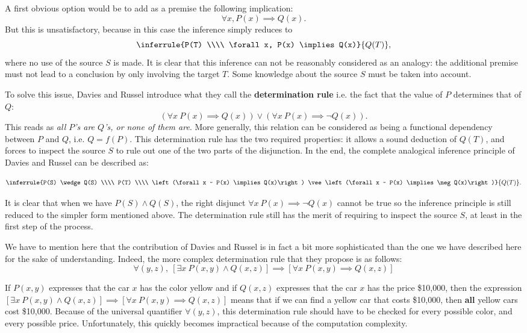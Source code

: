 A first obvious option would be to add as a premise the following implication:
$$\forall x, P(x) \implies Q(x).$$
But this is unsatisfactory, because in this case the inference simply reduces
to
$$\inferrule{P(T) \\\\ \forall x, P(x) \implies Q(x)}{Q(T)},$$ where no use of the
source $S$ is made. It is clear that this inference can not be reasonably
considered as an analogy: the additional premise must not lead to a conclusion
by only involving the target $T$. Some knowledge about the source $S$ must be
taken into account.

To solve this issue, Davies and Russel introduce what they call the
\textbf{determination rule} i.e. the fact that the value of $P$ determines that
of $Q$:
$$\left(\forall x ~ P(x) \implies Q(x)\right) \vee \left(\forall x ~ P(x) \implies
\neg Q(x)\right).$$
This reads as \textit{all $P$'s are $Q$'s, or none of them are}. More
generally, this relation can be considered as being a functional dependency
between $P$ and $Q$, i.e. $Q = f(P)$. This determination rule has the two
required properties: it allows a sound deduction of $Q(T)$, and forces to
inspect the source $S$ to rule out one of the two parts of the
disjunction. In the end, the complete analogical inference principle of Davies
and Russel can be described as:

$$\inferrule{P(S) \wedge Q(S) \\\\ P(T) \\\\  \left(\forall x ~ P(x) \implies
Q(x)\right) \vee \left(\forall x ~ P(x) \implies \neg Q(x)\right)}{Q(T)}.$$

It is clear that when we have $P(S) \wedge Q(S)$, the right disjunct $\forall x
~ P(x) \implies \neg Q(x)$ cannot be true so the inference principle is still
reduced to the simpler form mentioned above. The determination rule still has
the merit of requiring to inspect the source $S$, at least in the first step
of the process.

We have to mention here that the contribution of Davies and Russel is in fact a
bit more sophisticated than the one we have described here for the sake of
understanding. Indeed, the more complex determination rule that they propose is
as follows:
$$\forall (y, z), ~ \left[\exists x~ P(x, y) \wedge Q(x, z)\right] \implies
\left[\forall x~ P(x, y) \implies Q(x, z)\right]
$$

If $P(x, y)$ expresses that the car $x$ has the color yellow and if $Q(x, z)$
expresses that the car $x$ has the price \$10,000, then the expression
$\left[\exists x~ P(x, y) \wedge Q(x, z)\right] \implies\left[\forall x~ P(x,
y) \implies Q(x, z)\right]$ means that if we can find a yellow car that costs
\$10,000, then \textbf{all} yellow cars cost \$10,000. Because of the
universal quantifier $\forall(y, z)$, this determination rule should have to be checked for
every possible color, and every possible price. Unfortunately, this quickly
becomes impractical because of the computation complexity.


